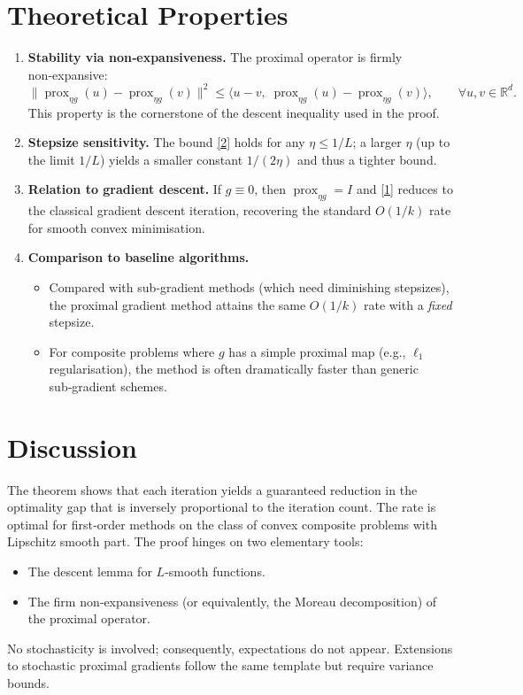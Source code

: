 \documentclass{article}
\newcommand{\prox}{\operatorname{prox}}
\newcommand{\R}{\mathbb{R}}
\begin{document}
\section*{Theoretical Properties}
\begin{enumerate}[label=\textbf{P\arabic*.},leftmargin=*,itemsep=1ex]
\item \textbf{Stability via non‑expansiveness.} The proximal operator is firmly non‑expansive:
\[
\|\prox_{\eta g}(u)-\prox_{\eta g}(v)\|^{2}
\le \langle u-v,\;\prox_{\eta g}(u)-\prox_{\eta g}(v)\rangle,
\qquad\forall u,v\in\R^{d}.
\tag{P1}
\]
This property is the cornerstone of the descent inequality used in the proof.
\item \textbf{Stepsize sensitivity.} The bound \eqref{2} holds for any $\eta\le1/L$; a larger $\eta$ (up to the limit $1/L$) yields a smaller constant $1/(2\eta)$ and thus a tighter bound.
\item \textbf{Relation to gradient descent.} If $g\equiv0$, then $\prox_{\eta g}=I$ and \eqref{1} reduces to the classical gradient descent iteration, recovering the standard $O(1/k)$ rate for smooth convex minimisation.
\item \textbf{Comparison to baseline algorithms.}
\begin{itemize}[nosep]
\item Compared with sub‑gradient methods (which need diminishing stepsizes), the proximal gradient method attains the same $O(1/k)$ rate with a \emph{fixed} stepsize.
\item For composite problems where $g$ has a simple proximal map (e.g., $\ell_{1}$ regularisation), the method is often dramatically faster than generic sub‑gradient schemes.
\end{itemize}
\end{enumerate}

\section*{Discussion}
The theorem shows that each iteration yields a guaranteed reduction in the optimality gap that is inversely proportional to the iteration count. The rate is optimal for first‑order methods on the class of convex composite problems with Lipschitz smooth part. The proof hinges on two elementary tools:

\begin{itemize}[nosep]
\item The descent lemma for $L$‑smooth functions.
\item The firm non‑expansiveness (or equivalently, the Moreau decomposition) of the proximal operator.
\end{itemize}
No stochasticity is involved; consequently, expectations do not appear. Extensions to stochastic proximal gradients follow the same template but require variance bounds.
\end{document}
